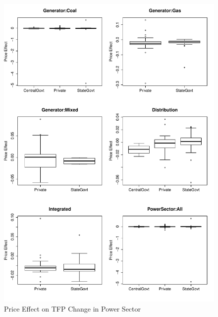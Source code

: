 \begin{figure}[h]
\centering
\caption{Price Effect on TFP Change in Power Sector}
	\label{fig:PriceChange}
	\includegraphics[width=1.00\textwidth]{chapter02/PriceChange.pdf}	
\end{figure}


